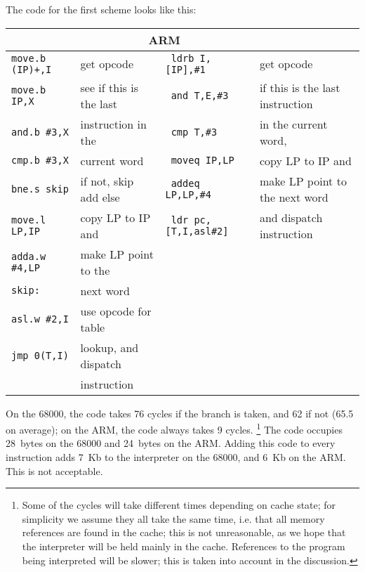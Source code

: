 \documentclass{article}
\newenvironment{code}%
{\begin{small}\begin{tabular}{>{\tt}ll>{\tt}ll}\toprule%
\multicolumn{2}{c}{\bf 68000} & \multicolumn{2}{c}{\bf ARM} \\%
\midrule}%
{\bottomrule\end{tabular}\end{small}}
\begin{document}
The code for the first scheme looks like this:

\begin{center}
\begin{code}

move.b (IP)+,I & get opcode & ldrb I,{[}IP{]},\#1 & get opcode\\

move.b IP,X & see if this is the last & and T,E,\#3 & if this is the last instruction\\

and.b \#3,X & instruction in the & cmp T,\#3 & in the current word,\\

cmp.b \#3,X & current word & moveq IP,LP & copy LP to IP and\\

bne.s skip & if not, skip add else & addeq LP,LP,\#4 & make LP point to the next
word\\

move.l LP,IP & copy LP to IP and & ldr pc,{[}T,I,asl\#2{]} & and dispatch instruction\\

adda.w \#4,LP & make LP point to the &&\\

skip: & next word &&\\

asl.w \#2,I & use opcode for table &&\\

jmp 0(T,I) & lookup, and dispatch &&\\

& instruction &&\\

\end{code}
\end{center}
\noindent On the 68000, the code takes 76 cycles if the branch is taken, and 62
if not (65.5 on average); on the ARM, the code always takes 9 cycles.%
\footnote{Some of the cycles will take different times depending on cache state; for simplicity
we assume they all take the same time, i.e. that all memory references are found
in the cache; this is not unreasonable, as we hope that the interpreter will be
held mainly in the cache. References to the program being interpreted will be
slower; this is taken into account in the discussion.
} The code occupies 28~bytes on the 68000 and 24~bytes on the ARM. Adding this
code to every instruction adds 7~Kb to the interpreter on the 68000, and 6~Kb
on the ARM. This is not acceptable.
\end{document}
